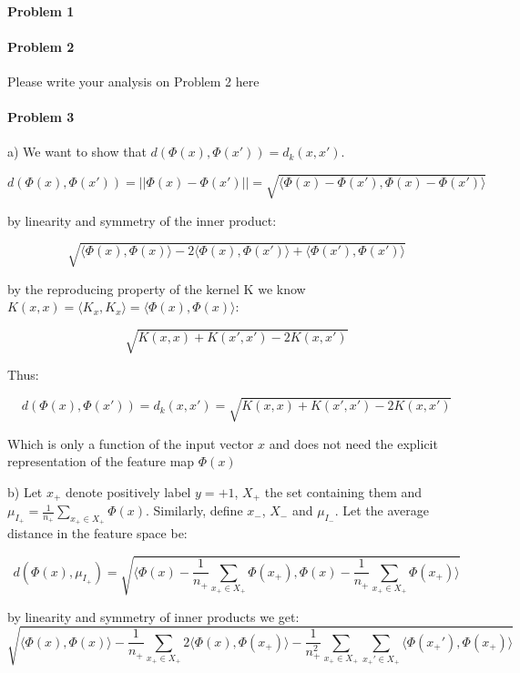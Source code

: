 \documentclass[12pt]{report}
\begin{document}
\maketitle

\paragraph{Problem 1}

\paragraph{Problem 2}
Please write your analysis on Problem 2 here



\paragraph{Problem 3}

a) We want to show that $d(\Phi(x), \Phi(x')) = d_{k}(x, x') $.

$$d(\Phi(x), \Phi(x')) = || \Phi(x) - \Phi(x')|| = \sqrt{ \langle \Phi(x) - \Phi(x'), \Phi(x) - \Phi(x') \rangle}$$

by linearity and symmetry of the inner product:

$$\sqrt{ \langle \Phi(x), \Phi(x) \rangle -  2\langle \Phi(x), \Phi(x') \rangle + \langle \Phi(x'), \Phi(x') \rangle}$$

by the reproducing property of the kernel K we know $K(x,x) = \langle K_x, K_x \rangle =\langle \Phi(x), \Phi(x) \rangle$:

$$\sqrt{ K(x,x) + K(x',x') - 2K(x,x')  }$$

Thus:

$$d(\Phi(x), \Phi(x')) =  d_{k}(x, x') = \sqrt{ K(x,x) + K(x',x') - 2K(x,x')  }$$

Which is only a function of the input vector $x$ and does not need the explicit representation of the feature map $\Phi(x)$

b) Let $x_+$ denote positively label $y = +1$, $X_+$ the set containing them and $ \mu_{I_+} =  \frac{1}{n_+}\sum_{x_+ \in X_+} \Phi(x) $. Similarly, define $x_-$, $X_-$ and $ \mu_{I_-}$. Let the average distance in the feature space be:

$$d(\Phi(x),  \mu_{I_+}) = \sqrt{ \langle \Phi(x) -  \frac{1}{n_+}\sum_{x_+ \in X_+}\Phi(x_+),   \Phi(x) - \frac{1}{n_+}\sum_{x_+  \in X_+}\Phi(x_+) \rangle }$$

by linearity and symmetry of inner products we get:
 $$\sqrt{ \langle \Phi(x), \Phi(x) \rangle - \frac{1}{n_+} \sum_{x_+ \in X_+} 2\langle \Phi(x), \Phi(x_+) \rangle - \frac{1}{n_+^2}\sum_{x_+ \in X_+} \sum_{x_+' \in X_+}  \langle  \Phi(x_+') , \Phi(x_+) \rangle       }$$
 
\end{document}
